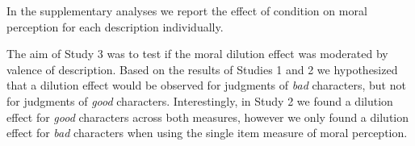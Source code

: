 \documentclass[
  american,
  man,floatsintext]{apa7}
\begin{document}
In the supplementary analyses we report the effect of condition on moral perception for each description individually.

The aim of Study 3 was to test if the moral dilution effect was moderated by valence of description. Based on the results of Studies 1 and 2 we hypothesized that a dilution effect would be observed for judgments of \emph{bad} characters, but not for judgments of \emph{good} characters. Interestingly, in Study 2 we found a dilution effect for \emph{good} characters across both measures, however we only found a dilution effect for \emph{bad} characters when using the single item measure of moral perception.
\end{document}
